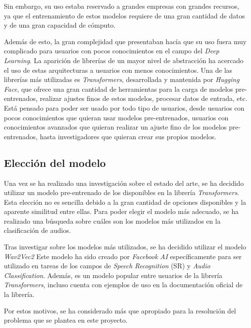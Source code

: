 Sin embargo, su uso estaba reservado a grandes empresas con grandes recursos, ya que el entrenamiento de estos modelos requiere de una gran cantidad de datos y de una gran capacidad de cómputo.

Además de esto, la gran complejidad que presentaban hacía que su uso fuera muy complicado para usuarios con pocos conocimientos en el campo del \textit{Deep Learning}.
La aparición de librerías de un mayor nivel de abstracción ha acercado el uso de estas arquitecturas a usuarios con menos conocimientos.
Una de las librerías más utilizadas es \textit{Transformers}, desarrollada y mantenida por \textit{Hugging Face}, que ofrece una gran cantidad de herramientas para la carga de modelos pre-entrenados, realizar ajustes finos de estos modelos, procesar datos de entrada, etc.
Está pensado para poder ser usado por todo tipo de usuarios, desde usuarios con pocos conocimientos que quieran usar modelos pre-entrenados, usuarios con conocimientos avanzados que quieran realizar un ajuste fino de los modelos pre-entrenados, hasta investigadores que quieran crear sus propios modelos. \cite{transformers-docs}


\subsection{Elección del modelo}\label{seccion:eleccion-del-modelo}
Una vez se ha realizado una investigación sobre el estado del arte, se ha decidido utilizar un modelo pre-entrenado de los disponibles en la librería \textit{Transformers}.
Esta elección no es sencilla debido a la gran cantidad de opciones disponibles y la aparente similitud entre ellas.
Para poder elegir el modelo más adecuado, se ha realizado una búsqueda sobre cuáles son los modelos más utilizados en la clasificación de audios.

Tras investigar sobre los modelos más utilizados, se ha decidido utilizar el modelo \textit{Wav2Vec2} \cite{baevski2020wav2vec}
Este modelo ha sido creado por \textit{Facebook AI} específicamente para ser utilizado en tareas de los campos de \textit{Speech Recognition} (SR) y \textit{Audio Classification}.
Además, es un modelo popular entre usuarios de la librería \textit{Transformers}, incluso cuenta con ejemplos de uso en la documentación oficial de la librería.

Por estos motivos, se ha considerado más que apropiado para la resolución del problema que se plantea en este proyecto.

